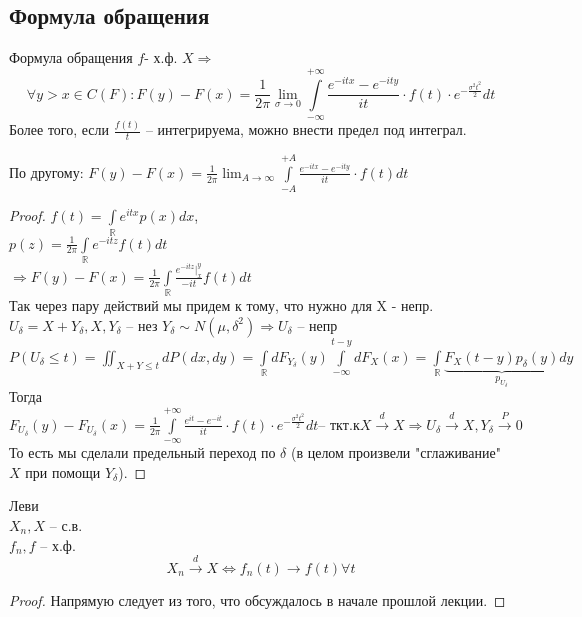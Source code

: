 \documentclass{article}
\begin{document}
    \subsection{Формула обращения}
    \begin{theorem}{Формула обращения}
    $f$- х.ф. $X \Rightarrow$ 
    $$\forall y > x \in C(F): F(y) - F(x) = \frac{1}{2\pi}\lim_{\sigma \to 0}\int\limits_{-\infty}^{+\infty} \frac{e^{-itx} - e^{-ity}}{it} \cdot f(t) \cdot e^{-\frac{\sigma^2t^2}{2}} dt  $$
    Более того, если $\frac{f(t)}{t} $ -- интегрируема, можно внести предел под интеграл.
    \begin{remark}
        По другому: $F(y) - F(x) = \frac{1}{2\pi}\lim_{A \to \infty}\int\limits_{-A}^{+A} \frac{e^{-itx} - e^{-ity}}{it} \cdot f(t) dt $
    \end{remark}
    \begin{proof}
        $f(t) = \int\limits_\mathbb{R} e^{itx} p(x) dx$,\\ $p(z) = \frac{1}{2\pi} \int\limits_\mathbb{R} e^{-itz} f(t) dt$ \\$  \Rightarrow F(y) - F(x) = \frac{1}{2\pi} \int\limits_\mathbb{R}\frac{e^{-itz}|_x^y}{-it} f(t) dt $ \\
        Так через пару действий мы придем к тому, что нужно для X - непр. \\ 
        $U_\delta = X+ Y_\delta, X, Y_\delta$ -- нез $Y_\delta \sim N(\mu, \delta^2) \Rightarrow U_\delta$ -- непр \\ 
        $P(U_\delta \le t) = \iint_{X+Y \le t} dP(dx, dy) = \int\limits_{\mathbb{R}} dF_{Y_\delta}(y) \int\limits_{-\infty}^{t-y} dF_X(x) = \int\limits_{\mathbb{R}} \underbrace{F_X(t-y) p_\delta(y)}_{p_{U_\delta}} dy$ \\ 
        Тогда $F_{U_\delta} (y) - F_{U_\delta} (x) = \frac{1}{2\pi} \int\limits_{-\infty}^{+\infty} \frac{e^{it} - e^{-it}}{it} \cdot f(t) \cdot e^{-\frac{\sigma^2t^2}{2}} dt \text{-- тк}  т.к X \xrightarrow{d} X \Rightarrow U_\delta \xrightarrow{d} X, Y_\delta \xrightarrow{P} 0$ \\ 
        То есть мы сделали предельный переход по $\delta$ (в целом произвели "сглаживание" $X$ при помощи $Y_\delta$). 
    \end{proof}
    \end{theorem}
    \begin{theorem}{Леви}\\
    $X_n, X$ -- с.в.\\
    $f_n, f$ -- х.ф. \\
    $$ X_n \xrightarrow{d} X \Leftrightarrow f_n(t) \to f(t) \forall t $$
    \begin{proof}
        Напрямую следует из того, что обсуждалось в начале прошлой лекции.
    \end{proof}
    \end{theorem}
\end{document}
